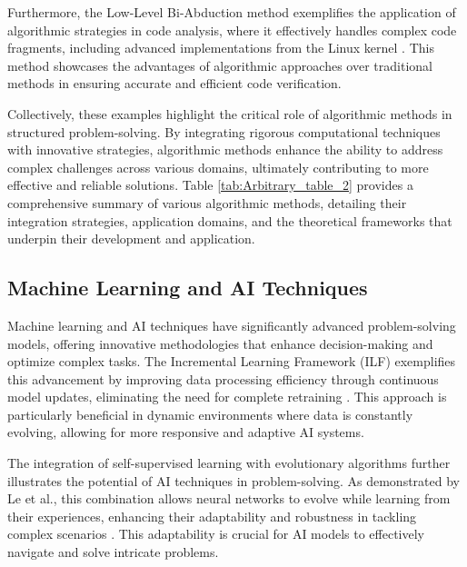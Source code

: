 Furthermore, the Low-Level Bi-Abduction method exemplifies the application of algorithmic strategies in code analysis, where it effectively handles complex code fragments, including advanced implementations from the Linux kernel \cite{holk2022lowlevelbiabduction}. This method showcases the advantages of algorithmic approaches over traditional methods in ensuring accurate and efficient code verification.

Collectively, these examples highlight the critical role of algorithmic methods in structured problem-solving. By integrating rigorous computational techniques with innovative strategies, algorithmic methods enhance the ability to address complex challenges across various domains, ultimately contributing to more effective and reliable solutions. Table \ref{tab:Arbitrary_table_2} provides a comprehensive summary of various algorithmic methods, detailing their integration strategies, application domains, and the theoretical frameworks that underpin their development and application.





\subsection{Machine Learning and AI Techniques} \label{subsec:Machine Learning and AI Techniques}



Machine learning and AI techniques have significantly advanced problem-solving models, offering innovative methodologies that enhance decision-making and optimize complex tasks. The Incremental Learning Framework (ILF) exemplifies this advancement by improving data processing efficiency through continuous model updates, eliminating the need for complete retraining \cite{ramasubramanian2009teachingresultanalysisusing}. This approach is particularly beneficial in dynamic environments where data is constantly evolving, allowing for more responsive and adaptive AI systems.

The integration of self-supervised learning with evolutionary algorithms further illustrates the potential of AI techniques in problem-solving. As demonstrated by Le et al., this combination allows neural networks to evolve while learning from their experiences, enhancing their adaptability and robustness in tackling complex scenarios \cite{le2019evolvingselfsupervisedneuralnetworks}. This adaptability is crucial for AI models to effectively navigate and solve intricate problems.

